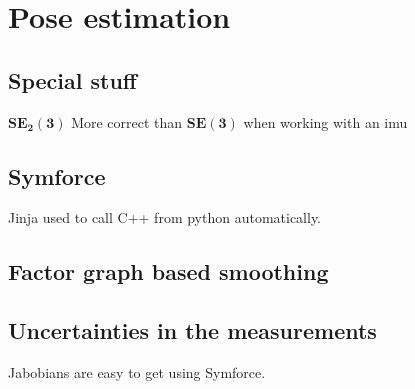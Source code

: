 \chapter{Pose estimation}

\section{Special stuff}
$\mathbf{SE_2(3)}$
More correct than $\mathbf{SE(3)}$ when working with an \gls{imu}

\section{Symforce}
Jinja used to call C++ from python automatically.

\section{Factor graph based smoothing}

\section{Uncertainties in the measurements}
Jabobians are easy to get using Symforce.

